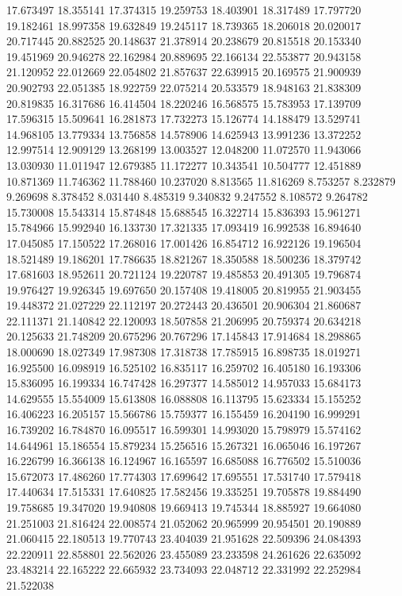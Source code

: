 17.673497
18.355141
17.374315
19.259753
18.403901
18.317489
17.797720
19.182461
18.997358
19.632849
19.245117
18.739365
18.206018
20.020017
20.717445
20.882525
20.148637
21.378914
20.238679
20.815518
20.153340
19.451969
20.946278
22.162984
20.889695
22.166134
22.553877
20.943158
21.120952
22.012669
22.054802
21.857637
22.639915
20.169575
21.900939
20.902793
22.051385
18.922759
22.075214
20.533579
18.948163
21.838309
20.819835
16.317686
16.414504
18.220246
16.568575
15.783953
17.139709
17.596315
15.509641
16.281873
17.732273
15.126774
14.188479
13.529741
14.968105
13.779334
13.756858
14.578906
14.625943
13.991236
13.372252
12.997514
12.909129
13.268199
13.003527
12.048200
11.072570
11.943066
13.030930
11.011947
12.679385
11.172277
10.343541
10.504777
12.451889
10.871369
11.746362
11.788460
10.237020
8.813565
11.816269
8.753257
8.232879
9.269698
8.378452
8.031440
8.485319
9.340832
9.247552
8.108572
9.264782
15.730008
15.543314
15.874848
15.688545
16.322714
15.836393
15.961271
15.784966
15.992940
16.133730
17.321335
17.093419
16.992538
16.894640
17.045085
17.150522
17.268016
17.001426
16.854712
16.922126
19.196504
18.521489
19.186201
17.786635
18.821267
18.350588
18.500236
18.379742
17.681603
18.952611
20.721124
19.220787
19.485853
20.491305
19.796874
19.976427
19.926345
19.697650
20.157408
19.418005
20.819955
21.903455
19.448372
21.027229
22.112197
20.272443
20.436501
20.906304
21.860687
22.111371
21.140842
22.120093
18.507858
21.206995
20.759374
20.634218
20.125633
21.748209
20.675296
20.767296
17.145843
17.914684
18.298865
18.000690
18.027349
17.987308
17.318738
17.785915
16.898735
18.019271
16.925500
16.098919
16.525102
16.835117
16.259702
16.405180
16.193306
15.836095
16.199334
16.747428
16.297377
14.585012
14.957033
15.684173
14.629555
15.554009
15.613808
16.088808
16.113795
15.623334
15.155252
16.406223
16.205157
15.566786
15.759377
16.155459
16.204190
16.999291
16.739202
16.784870
16.095517
16.599301
14.993020
15.798979
15.574162
14.644961
15.186554
15.879234
15.256516
15.267321
16.065046
16.197267
16.226799
16.366138
16.124967
16.165597
16.685088
16.776502
15.510036
15.672073
17.486260
17.774303
17.699642
17.695551
17.531740
17.579418
17.440634
17.515331
17.640825
17.582456
19.335251
19.705878
19.884490
19.758685
19.347020
19.940808
19.669413
19.745344
18.885927
19.664080
21.251003
21.816424
22.008574
21.052062
20.965999
20.954501
20.190889
21.060415
22.180513
19.770743
23.404039
21.951628
22.509396
24.084393
22.220911
22.858801
22.562026
23.455089
23.233598
24.261626
22.635092
23.483214
22.165222
22.665932
23.734093
22.048712
22.331992
22.252984
21.522038
